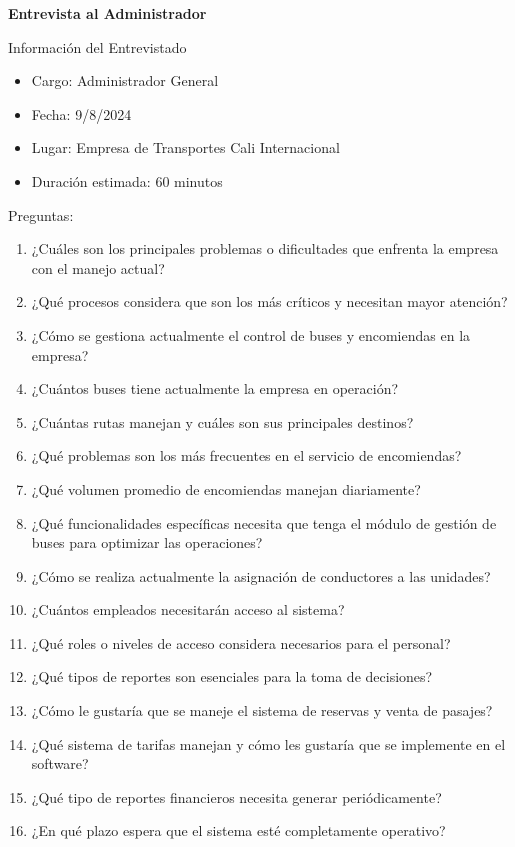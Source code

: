 	\textbf{Entrevista al Administrador}
	
	Información del Entrevistado
	\begin{itemize}[label=$-$, left=0cm, labelsep = 0.9cm, topsep = 0pt, parsep = 0pt]
		\item Cargo: Administrador General
		\item Fecha: 9/8/2024
		\item Lugar: Empresa de Transportes Cali Internacional
		\item Duración estimada: 60 minutos
	\end{itemize}
	
	Preguntas:
	
	\begin{enumerate}[left=0.1cm, labelsep = 0.9cm, topsep = 0pt, parsep = 0pt]
		\item ¿Cuáles son los principales problemas o dificultades que enfrenta la empresa con el manejo actual?
		\item ¿Qué procesos considera que son los más críticos y necesitan mayor atención?
		\item ¿Cómo se gestiona actualmente el control de buses y encomiendas en la empresa?
		\item ¿Cuántos buses tiene actualmente la empresa en operación?
		\item ¿Cuántas rutas manejan y cuáles son sus principales destinos?
		\item ¿Qué problemas son los más frecuentes en el servicio de encomiendas?
		\item ¿Qué volumen promedio de encomiendas manejan diariamente?
		\item ¿Qué funcionalidades específicas necesita que tenga el módulo de gestión de buses para optimizar las operaciones?
		\item ¿Cómo se realiza actualmente la asignación de conductores a las unidades?
		\item ¿Cuántos empleados necesitarán acceso al sistema?
		\item ¿Qué roles o niveles de acceso considera necesarios para el personal?
		\item ¿Qué tipos de reportes son esenciales para la toma de decisiones?
		\item ¿Cómo le gustaría que se maneje el sistema de reservas y venta de pasajes?
		\item ¿Qué sistema de tarifas manejan y cómo les gustaría que se implemente en el software?
		\item ¿Qué tipo de reportes financieros necesita generar periódicamente?
		\item ¿En qué plazo espera que el sistema esté completamente operativo?
	\end{enumerate}
	
